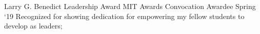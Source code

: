 \experience
    {Larry G. Benedict Leadership Award}
    {MIT Awards Convocation Awardee}
    {Spring `19}
    {
        Recognized for showing dedication for empowering my fellow students to develop as leaders;
    }
